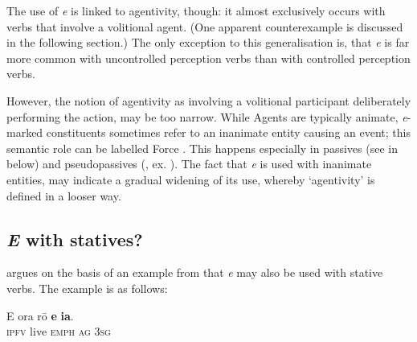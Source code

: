 The use of \textit{e} is linked to agentivity, though: it almost exclusively occurs with verbs that involve a volitional agent. (One apparent counterexample is discussed in the following section.) The only exception to this generalisation is, that \textit{e} is far more common with uncontrolled perception verbs than with controlled perception verbs.

However, the notion of agentivity as involving a volitional participant deliberately performing the action, may be too narrow. While Agents are typically animate, \textit{e}{}-marked constituents sometimes refer to an inanimate entity causing an event; this semantic role can be labelled Force \citep[47]{Payne1997}. This happens especially in passives (see  in  below) and pseudopassives (, ex. ). The fact that \textit{e} is used with inanimate entities, may indicate a gradual widening of its use, whereby ‘agentivity’ is defined in a looser way. 

\subsection{\textit{E} with statives?}\label{sec:8.3.1.3}

\citet[36–37]{WeberN2003} argues on the basis of an example from \citet{Englert1978} that \textit{e} may also be used with stative verbs. The example is as follows:

\ea\label{ex:8.17}
\gll E ora rō \textbf{e} \textbf{ia}.\\
\textsc{ipfv} live \textsc{emph} \textsc{ag} \textsc{3sg}\\


